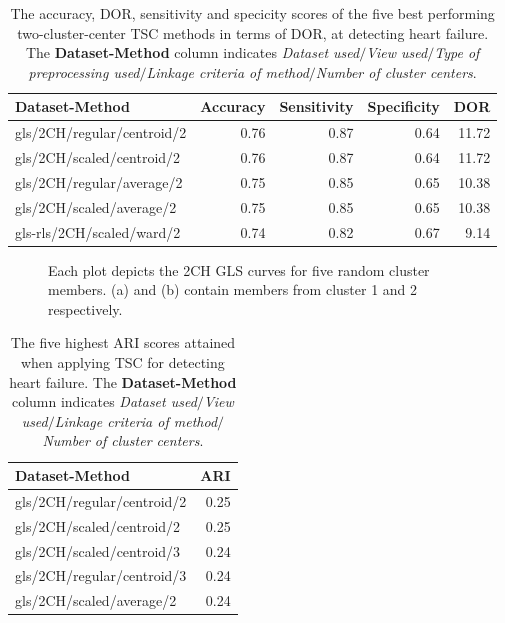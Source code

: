 \begin{table}
    \centering
    \begin{tabular}{lrrrr}
        \toprule
        Dataset-Method             &  Accuracy &  Sensitivity &  Specificity & DOR \\
        \midrule
        gls/2CH/regular/centroid/2 &      0.76 &         0.87 &         0.64 & 11.72 \\
        gls/2CH/scaled/centroid/2  &      0.76 &         0.87 &         0.64 & 11.72 \\
        gls/2CH/regular/average/2  &      0.75 &         0.85 &         0.65 & 10.38 \\
        gls/2CH/scaled/average/2   &      0.75 &         0.85 &         0.65 & 10.38 \\
        gls-rls/2CH/scaled/ward/2  &      0.74 &         0.82 &         0.67 &  9.14 \\
        \bottomrule
    \end{tabular}
    \caption{The accuracy, DOR, sensitivity and specicity scores of the five best performing two-cluster-center TSC methods in terms of DOR, at detecting heart failure.
             The \textbf{Dataset-Method} column indicates \textit{Dataset used}$/$\textit{View used}$/$\textit{Type of preprocessing used}$/$\textit{Linkage criteria of method}$/$\textit{Number of cluster centers}.}
    \label{tab:tsc_hf_dor_sens_spec_dist}
\end{table}

\begin{figure}[htb]
    \centering
    
    \caption{Each plot depicts the 2CH GLS curves for five random cluster members. (a) and (b) contain members from cluster 1 and 2 respectively.}
    \label{fig:tsc_hf_best_meth_5_samples}
\end{figure}

\begin{table}[htb]
    \centering
    \begin{tabular}{lr}
        \toprule
        Dataset-Method             &  ARI \\
        \midrule
        gls/2CH/regular/centroid/2 & 0.25 \\
        gls/2CH/scaled/centroid/2  & 0.25 \\
        gls/2CH/scaled/centroid/3  & 0.24 \\
        gls/2CH/regular/centroid/3 & 0.24 \\
        gls/2CH/scaled/average/2   & 0.24 \\
        \bottomrule
    \end{tabular}
    \caption{The five highest ARI scores attained when applying TSC for detecting heart failure.
             The \textbf{Dataset-Method} column indicates \textit{Dataset used}$/$\textit{View used}$/$\textit{Linkage criteria of method}$/$\textit{Number of cluster centers}.}
    \label{tab:tsc_hf_ari}
\end{table}

